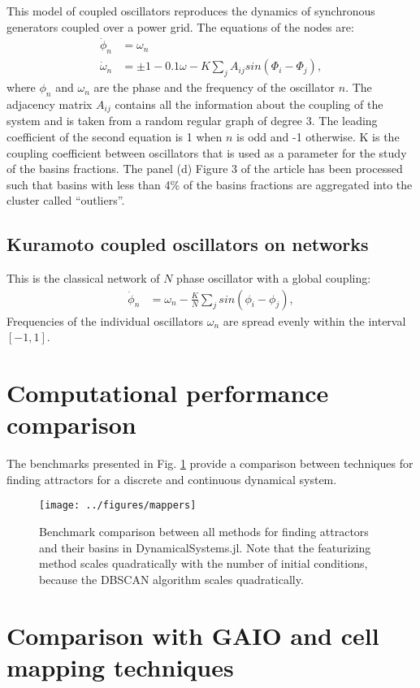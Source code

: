 \documentclass[9pt,twoside,lineno]{pnas-new}
\begin{document}
This model of coupled oscillators reproduces the dynamics of synchronous generators coupled over a power grid. The equations of the nodes are: 
\begin{align*}
\dot \phi_n &=  \omega_n\\
\dot \omega_n &= \pm 1 - 0.1\omega - K \sum_j A_{ij}sin(\Phi_i - \Phi_j),
\end{align*}
where $\phi_n$ and $\omega_n$ are the phase and the frequency of the oscillator $n$. The adjacency matrix $A_{ij}$ contains all the information about the coupling of the system and is taken from a random regular graph of degree 3. The leading coefficient of the second equation is 1 when $n$ is odd and -1 otherwise. K is the coupling coefficient between oscillators that is used as a parameter for the study of the basins fractions. The panel (d) Figure 3 of the article has been processed such that basins with less than 4\% of the basins fractions are aggregated into the cluster called ``outliers''. 

\subsection*{Kuramoto coupled oscillators on networks}
This is the classical network of $N$ phase oscillator with a global coupling: 
\begin{align*}
\dot \phi_n &= \omega_n - \frac{K}{N} \sum_j sin(\phi_i - \phi_j),
\end{align*}
Frequencies of the individual oscillators $\omega_n$ are spread evenly within the interval $[-1, 1]$. 

\section{Computational performance comparison}
The benchmarks presented in Fig. \ref{fig:benchmarks} provide a comparison between techniques for finding attractors for a discrete and continuous dynamical system.
\begin{figure}[!h]
    \centering
    \texttt{[image: ../figures/mappers]}
    \caption{Benchmark comparison between all methods for finding attractors and their basins in DynamicalSystems.jl. Note that the featurizing method scales quadratically with the number of initial conditions, because the DBSCAN algorithm scales quadratically.}
    \label{fig:benchmarks}
\end{figure}

\section{Comparison with GAIO and cell mapping techniques} 
\end{document}
